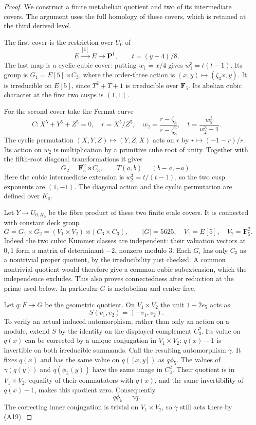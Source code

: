 \documentclass[11pt,oneside]{article}
\begin{document}
\begin{proof}
We construct a finite metabelian quotient and two of its
intermediate covers. The argument uses the full homology
of these covers, which is retained at the third derived
level.

The first cover is the restriction over $U_0$ of
\[
 E\xrightarrow{[5]}E\longrightarrow\mathbf P^1,
       \qquad t=(y+4)/8.
\]
The last map is a cyclic cubic cover: putting $w_1=x/4$
gives $w_1^3=t(t-1)$. Its group is
$G_1=E[5]\rtimes C_3$, where the order-three action is
$(x,y)\mapsto(\zeta_3x,y)$. It is irreducible on $E[5]$,
since $T^2+T+1$ is irreducible over $\mathbf F_5$.
Its abelian cubic character at the first two cusps is
$(1,1)$.

For the second cover take the Fermat curve
\[
 C:X^5+Y^5+Z^5=0,
 \quad r=X^5/Z^5,\quad
 w_2=\frac{r-\zeta_3}{r-\zeta_3^2},\quad
 t=\frac{w_2^3}{w_2^3-1}.
\]
The cyclic permutation $(X,Y,Z)\mapsto(Y,Z,X)$ acts
on $r$ by $r\mapsto(-1-r)/r$. Its action on $w_2$ is
multiplication by a primitive cube root of unity.
Together with the fifth-root diagonal transformations
it gives
\[
 G_2=\mathbf F_5^2\rtimes C_3,\qquad
 T(a,b)=(b-a,-a).
\]
Here the cubic intermediate extension is
$w_2^3=t/(t-1)$, so the two cusp exponents are $(1,-1)$.
The diagonal action and the cyclic permutation are defined
over $K_0$.

Let $Y\to U_{0,K_0}$ be the fibre product of these two
finite etale covers. It is connected with constant deck
group
\[
 G=G_1\times G_2
   =(V_1\times V_2)\rtimes(C_3\times C_3),
 \qquad |G|=5625,
 \quad V_1=E[5],\quad V_2=\mathbf F_5^2.
                                                               \tag{A18}
\]
Indeed the two cubic Kummer classes are independent:
their valuation vectors at $0,1$ form a matrix of
determinant $-2$, nonzero modulo $3$. Each $G_i$ has
only $C_3$ as a nontrivial proper quotient, by the
irreducibility just checked. A common nontrivial quotient
would therefore give a common cubic subextension, which
the independence excludes. This also proves connectedness
after reduction at the prime used below. In particular
$G$ is metabelian and center-free.

Let $q:F\twoheadrightarrow G$ be the geometric quotient.
On $V_1\times V_2$ the unit $1-2e_5$ acts as
\[
                 S(v_1,v_2)=(-v_1,v_2).                       \tag{A19}
\]
To verify an actual induced automorphism, rather than only
an action on a module, extend $S$ by the identity on the
displayed complement $C_3^2$. Its value on $q(x)$ can be
corrected by a unique conjugation in $V_1\times V_2$:
$q(x)-1$ is invertible on both irreducible summands.
Call the resulting automorphism $\gamma$. It fixes
$q(x)$ and has the same value on $q([x,y])$ as $q\phi_5$.
The values of $\gamma(q(y))$ and $q(\phi_5(y))$ have the
same image in $C_3^2$. Their quotient is in $V_1\times V_2$;
equality of their commutators with $q(x)$, and the same
invertibility of $q(x)-1$, makes this quotient zero.
Consequently
\[
                         q\phi_5=\gamma q.
\]
The correcting inner conjugation is trivial on $V_1\times V_2$,
so $\gamma$ still acts there by (A19).


\end{proof}
\end{document}
